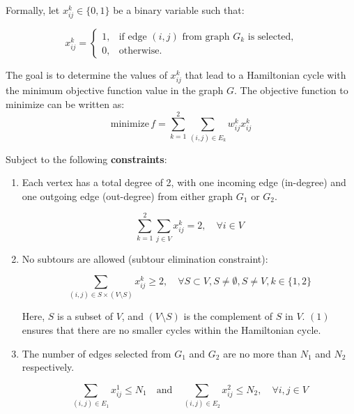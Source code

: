 \documentclass{extarticle}
\begin{document}
Formally, let $x_{ij}^k \in \{0, 1\}$ be a binary variable such that:

\begin{equation*}
  x_{ij}^k =
  \begin{cases}
    1, & \text{if edge } (i, j) \text{ from graph } G_k \text{ is selected,} \\
    0, & \text{otherwise.}
  \end{cases}
\end{equation*}

The goal is to determine the values of $x_{ij}^k$ that lead to a Hamiltonian
cycle with the minimum objective function value in the graph $G$. The objective
function to minimize can be written as:
\begin{equation*}
  \text{minimize} \, f = \sum_{k=1}^{2} \sum_{(i,j) \in E_k} w_{ij}^k x_{ij}^k
\end{equation*}

Subject to the following \textbf{constraints}:

\begin{enumerate}
  \item Each vertex has a total degree of 2, with one incoming edge (in-degree) and one
        outgoing edge (out-degree) from either graph $G_1$ or $G_2$.

        \begin{equation*}
          \sum_{k=1}^{2} \sum_{j \in V} x_{ij}^k = 2, \quad \forall i \in V
        \end{equation*}
  \item No subtours are allowed (subtour elimination constraint):

        \begin{equation}
          \sum_{(i,j) \in S \times (V \setminus S)} x_{ij}^k \geq 2, \quad \forall S \subset V, S \neq \emptyset, S \neq V, k \in \{1, 2\}
        \end{equation}

        Here, $S$ is a subset of $V$, and $(V \setminus S)$ is the complement of $S$ in
        $V$. $(1)$ ensures that there are no smaller cycles within the Hamiltonian cycle.
  \item The number of edges selected from $G_1$ and $G_2$ are no more than $N_1$ and
        $N_2$ respectively.

        \begin{equation*}
          \sum_{(i,j) \in E_1} x_{ij}^1 \leq N_1 \quad \text{and} \quad \sum_{(i,j) \in E_2} x_{ij}^2 \leq N_2,  \quad \forall i,j \in V
        \end{equation*}
\end{enumerate}
\end{document}
